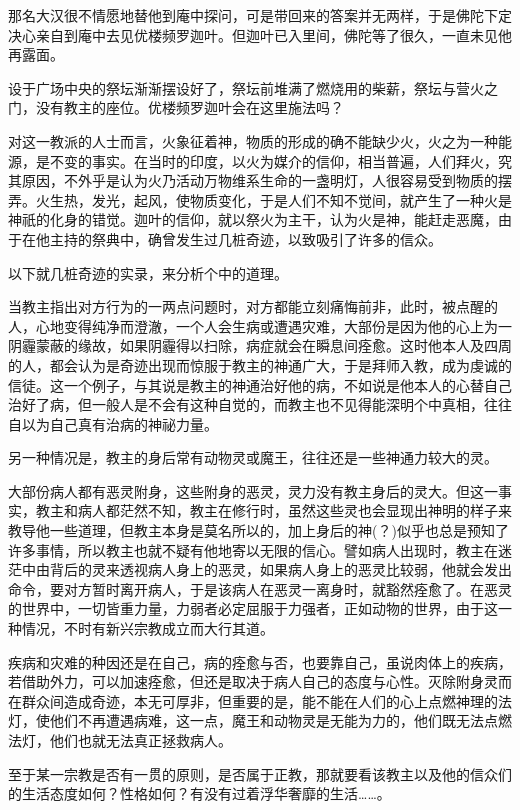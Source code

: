 \documentclass[12pt,twoside,openany]{book}
\begin{document}
那名大汉很不情愿地替他到庵中探问，可是带回来的答案并无两样，于是佛陀下定决心亲自到庵中去见优楼频罗迦叶。但迦叶已入里间，佛陀等了很久，一直未见他再露面。

设于广场中央的祭坛渐渐摆设好了，祭坛前堆满了燃烧用的柴薪，祭坛与营火之门，没有教主的座位。优楼频罗迦叶会在这里施法吗？

对这一教派的人士而言，火象征着神，物质的形成的确不能缺少火，火之为一种能源，是不变的事实。在当时的印度，以火为媒介的信仰，相当普遍，人们拜火，究其原因，不外乎是认为火乃活动万物维系生命的一盏明灯，人很容易受到物质的摆弄。火生热，发光，起风，使物质变化，于是人们不知不觉间，就产生了一种火是神祇的化身的错觉。迦叶的信仰，就以祭火为主干，认为火是神，能赶走恶魔，由于在他主持的祭典中，确曾发生过几桩奇迹，以致吸引了许多的信众。

以下就几桩奇迹的实录，来分析个中的道理。

当教主指出对方行为的一两点问题时，对方都能立刻痛悔前非，此时，被点醒的人，心地变得纯净而澄澈，一个人会生病或遭遇灾难，大部份是因为他的心上为一阴霾蒙蔽的缘故，如果阴霾得以扫除，病症就会在瞬息间痊愈。这时他本人及四周的人，都会认为是奇迹出现而惊服于教主的神通广大，于是拜师入教，成为虔诚的信徒。这一个例子，与其说是教主的神通治好他的病，不如说是他本人的心替自己治好了病，但一般人是不会有这种自觉的，而教主也不见得能深明个中真相，往往自以为自己真有治病的神祕力量。

另一种情况是，教主的身后常有动物灵或魔王，往往还是一些神通力较大的灵。

大部份病人都有恶灵附身，这些附身的恶灵，灵力没有教主身后的灵大。但这一事实，教主和病人都茫然不知，教主在修行时，虽然这些灵也会显现出神明的样子来教导他一些道理，但教主本身是莫名所以的，加上身后的神(？)似乎也总是预知了许多事情，所以教主也就不疑有他地寄以无限的信心。譬如病人出现时，教主在迷茫中由背后的灵来透视病人身上的恶灵，如果病人身上的恶灵比较弱，他就会发出命令，要对方暂时离开病人，于是该病人在恶灵一离身时，就豁然痊愈了。在恶灵的世界中，一切皆重力量，力弱者必定屈服于力强者，正如动物的世界，由于这一种情况，不时有新兴宗教成立而大行其道。

疾病和灾难的种因还是在自己，病的痊愈与否，也要靠自己，虽说肉体上的疾病，若借助外力，可以加速痊愈，但还是取决于病人自己的态度与心性。灭除附身灵而在群众间造成奇迹，本无可厚非，但重要的是，能不能在人们的心上点燃神理的法灯，使他们不再遭遇病难，这一点，魔王和动物灵是无能为力的，他们既无法点燃法灯，他们也就无法真正拯救病人。

至于某一宗教是否有一贯的原则，是否属于正教，那就要看该教主以及他的信众们的生活态度如何？性格如何？有没有过着浮华奢靡的生活……。
\end{document}
